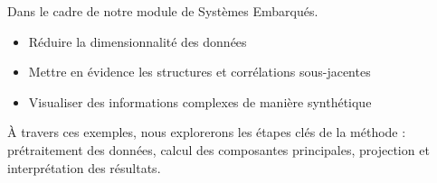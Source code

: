 \documentclass[12pt]{article}
\begin{document}
 







\tableofcontents
\label{toc} %


\listoffigures

\newpage


\clearpage
\setcounter{page}{3}

\pagestyle{fancy}

Dans le cadre de notre module de Systèmes Embarqués.
\begin{itemize}
    \item Réduire la dimensionnalité des données
    \item Mettre en évidence les structures et corrélations sous-jacentes
    \item Visualiser des informations complexes de manière synthétique
\end{itemize}

À travers ces exemples, nous explorerons les étapes clés de la méthode : prétraitement des données, calcul des composantes principales, projection et interprétation des résultats.


\vspace{0.5cm}


\newpage
\end{document}
